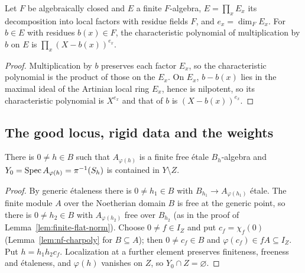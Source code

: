 \begin{lemma}\label{lem:nf-local-charpoly}
\leanok
{}
Let $F$ be algebraically closed and $E$ a finite $F$-algebra, $E=\prod_xE_x$ its decomposition into local factors
with residue fields $F$, and $e_x=\dim_FE_x$. For $b\in E$ with residues $b(x)\in F$, the characteristic polynomial of
multiplication by $b$ on $E$ is $\prod_x(X-b(x))^{e_x}$.
\end{lemma}

\begin{proof}
Multiplication by $b$ preserves each factor $E_x$, so the characteristic polynomial is the product of those on the
$E_x$. On $E_x$, $b-b(x)$ lies in the maximal ideal of the Artinian local ring $E_x$, hence is nilpotent, so its
characteristic polynomial is $X^{e_x}$ and that of $b$ is $(X-b(x))^{e_x}$.
\end{proof}

\subsection{The good locus, rigid data and the weights}\label{subsec:nf-weights}

\begin{lemma}\label{lem:nf-good-locus}
\leanok
{}
There is $0\ne h\in B$ such that $A_{\varphi(h)}$ is a finite free \'etale $B_h$-algebra and
$Y_0=\operatorname{Spec} A_{\varphi(h)}=\pi^{-1}(S_h)$ is contained in $Y\setminus Z$.
\end{lemma}

\begin{proof}
By generic \'etaleness there is $0\ne h_1\in B$ with $B_{h_1}\to A_{\varphi(h_1)}$ \'etale. The finite module $A$ over
the Noetherian domain $B$ is free at the generic point, so there is $0\ne h_2\in B$ with $A_{\varphi(h_2)}$ free over
$B_{h_2}$ (as in the proof of Lemma~\ref{lem:finite-flat-norm}). Choose $0\ne f\in I_Z$ and put $c_f=\chi_f(0)$
(Lemma~\ref{lem:nf-charpoly} for $B\subseteq A$); then $0\ne c_f\in B$ and $\varphi(c_f)\in fA\subseteq I_Z$. Put
$h=h_1h_2c_f$. Localization at a further element preserves finiteness, freeness and \'etaleness, and $\varphi(h)$
vanishes on $Z$, so $Y_0\cap Z=\varnothing$.
\end{proof}

